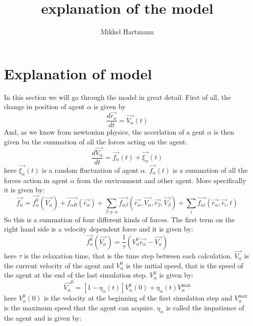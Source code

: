 \documentclass[12pt,a4paper]{report} %
\author{Mikkel Hartmann}
\title{explanation of the model}
\begin{document}
 
\section{Explanation of model}
In this section we will go through the model in great detail. First of all, the change in position of agent $\alpha$ is given by
	\begin{equation}
		\frac{d \vec{r_{\alpha}}}{dt} = \vec{V_{\alpha}} \left( t \right)
	\end{equation}
And, as we know from newtonian physics, the accerlation of a gent $\alpha$ is then given bu the summation of all the forces acting on the agent.
\begin{equation}
	\frac{d \vec{V_{\alpha}}}{dt} = \vec{f_{\alpha}} \left( t \right) + \vec{\xi_{\alpha}}\left( t \right)
\end{equation}
here $\vec{\xi_{\alpha}} \left( t \right)$ is a random fluctuation of agent $\alpha$. $\vec{f_{\alpha}} \left( t \right)$ is a summation of all the forces action in agent $\alpha$ from the environment and other agent. More specifically it is given by:
\begin{equation}\label{model}
	\vec{f_{\alpha}} = \vec{f^{0}_{\alpha}}\left( \vec{V_{\alpha}} \right) + \vec{f_{\alpha B}} \left( \vec{r_{\alpha}} \right) + \sum_{\beta \neq \alpha} \vec{f_{\alpha \beta}} \left(\vec{r_{\alpha}}, \vec{V_{\alpha}}, \vec{r_{\beta}}, \vec{V_{\beta}} \right) + \sum_{i} \vec{f_{\alpha i}} \left( \vec{r_{\alpha}}, \vec{r_{i}}, t \right)
\end{equation}
So this is a summation of four different kinds of forces. The first term on the right hand side is a velocity dependent force and it is given by:
\begin{equation}
	\vec{f^{0}_{\alpha}}\left( \vec{V_{\alpha}} \right) = \frac{1}{\tau} \left( V_{\alpha}^{0} \vec{e_{\alpha}} - \vec{V_{\alpha}} \right)
\end{equation}
here $\tau$ is the relaxation time, that is the time step between each calculation. $\vec{V_{\alpha}}$ is the current velocity of the agent and $V_{\alpha}^{0}$ is the initial speed, that is the speed of the agent at the end of the last simulation step. $V_{\alpha}^{0}$ is given by:
\begin{equation}
	\vec{V_{\alpha}}^{0} = \left[ 1 - \eta_{\alpha} \left( t \right) \right] V_{\alpha}^{0} \left( 0 \right) + \eta_{\alpha} \left( t \right)V_{\alpha}^{\text{max}}
\end{equation}
here $V_{\alpha}^{0} \left( 0 \right)$ is the velocity at the beginning of the first simulation step and $V_{\alpha}^{\text{max}}$ is the maximum speed that the agent can acquire. $\eta_{\alpha}$ is called the impatience of the agent and is given by:
\end{document}
